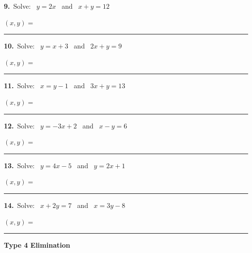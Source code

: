 \documentclass[11pt,letterpaper]{article}
\newcommand{\topicbar}[1]{\needspace{4.5cm}\par\vspace{5mm}
  \begin{tcolorbox}[enhanced,colback=fmtitle,colframe=fmtitle,arc=2mm,left=4mm,top=1.5mm,bottom=1.5mm]
  \color{white}\bfseries\large #1
  \end{tcolorbox}}
\begin{document}
\needspace{3.9cm}\par\vspace{3mm}\noindent \begin{minipage}[t][3.4cm]{0.48\linewidth}\raggedright{\color{fmturn}\bfseries 9.}\ Solve: \ $y = 2x$ \ and \ $x + y = 12$\par\vfill\hfill $(x, y) =$\ \rule{3.2cm}{0.4pt}\end{minipage}\hfill \begin{minipage}[t][3.4cm]{0.48\linewidth}\raggedright{\color{fmturn}\bfseries 10.}\ Solve: \ $y = x + 3$ \ and \ $2x + y = 9$\par\vfill\hfill $(x, y) =$\ \rule{3.2cm}{0.4pt}\end{minipage}\par
\needspace{3.9cm}\par\vspace{3mm}\noindent \begin{minipage}[t][3.4cm]{0.48\linewidth}\raggedright{\color{fmturn}\bfseries 11.}\ Solve: \ $x = y - 1$ \ and \ $3x + y = 13$\par\vfill\hfill $(x, y) =$\ \rule{3.2cm}{0.4pt}\end{minipage}\hfill \begin{minipage}[t][3.4cm]{0.48\linewidth}\raggedright{\color{fmturn}\bfseries 12.}\ Solve: \ $y = -3x + 2$ \ and \ $x - y = 6$\par\vfill\hfill $(x, y) =$\ \rule{3.2cm}{0.4pt}\end{minipage}\par
\needspace{3.9cm}\par\vspace{3mm}\noindent \begin{minipage}[t][3.4cm]{0.48\linewidth}\raggedright{\color{fmturn}\bfseries 13.}\ Solve: \ $y = 4x - 5$ \ and \ $y = 2x + 1$\par\vfill\hfill $(x, y) =$\ \rule{3.2cm}{0.4pt}\end{minipage}\hfill \begin{minipage}[t][3.4cm]{0.48\linewidth}\raggedright{\color{fmturn}\bfseries 14.}\ Solve: \ $x + 2y = 7$ \ and \ $x = 3y - 8$\par\vfill\hfill $(x, y) =$\ \rule{3.2cm}{0.4pt}\end{minipage}\par
\needspace{9cm}\topicbar{Type 4 \quad Elimination}
\end{document}
